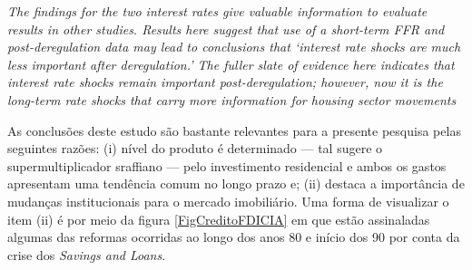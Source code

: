 \begin{citacao}
	\textit{The findings for the two interest rates give valuable information to evaluate results in
	other studies. Results here suggest that use of a short-term FFR and post-deregulation data
	may lead to conclusions that `interest rate shocks are much less important after
	deregulation.' The fuller slate of evidence here indicates that interest rate shocks remain
	important post-deregulation; however, now it is the long-term rate shocks that carry more
	information for housing sector movements} \cite[p.~346]{gauger_residential_2003}
\end{citacao}

As conclusões deste estudo são bastante relevantes para a presente pesquisa pelas seguintes razões: 
	(i) nível do produto é determinado --- tal sugere o supermultiplicador sraffiano --- pelo investimento residencial e ambos os gastos apresentam uma tendência comum no longo prazo e; 
	(ii) destaca a importância de mudanças institucionais para o mercado imobiliário.
Uma forma de visualizar o item (ii) é por meio da figura \ref{FigCreditoFDICIA} em que estão assinaladas algumas das reformas ocorridas ao longo dos anos 80 e início dos 90 por conta da crise dos \textit{Savings and Loans}.
